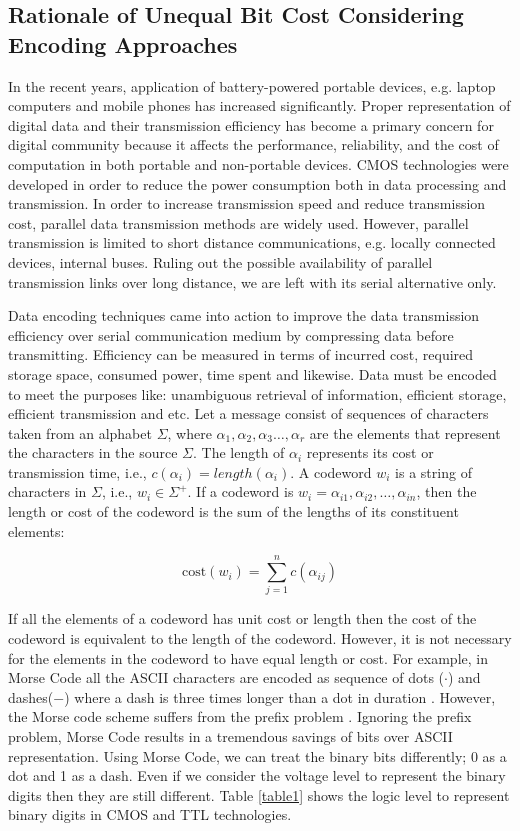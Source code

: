 \documentclass[preprint,12pt]{elsarticle}
\begin{document}
\subsection{Rationale of Unequal Bit Cost Considering Encoding Approaches}
In the recent years, application of battery-powered portable devices, e.g. laptop computers and mobile phones has increased significantly. Proper representation of digital data and their transmission efficiency has become a primary concern for digital community because it affects the performance, reliability, and the cost of computation in both portable and non-portable devices. CMOS technologies were developed in order to reduce the power consumption both in data processing and transmission. In order to increase transmission speed and reduce transmission cost, parallel data transmission methods are widely used. However, parallel transmission is limited to short distance communications, e.g. locally connected devices, internal buses. Ruling out the possible availability of parallel transmission
links over long distance, we are left with its serial alternative only. 

Data encoding techniques came into action to improve the data transmission efficiency over serial communication medium by compressing data before transmitting. Efficiency can be measured in terms of incurred cost, required storage space, consumed power, time spent and likewise. Data must be
encoded to meet the purposes like: unambiguous retrieval of information, efficient storage, efficient transmission and etc. Let a message consist of sequences of characters taken from an alphabet $\Sigma$, where  $\alpha_1,\alpha_2,\alpha_3\ldots,\alpha_r$ are the elements that represent the characters in the source $\Sigma$. The length of $\alpha_i$ represents its cost or transmission time, i.e., $c\left(\alpha_i\right)= length(\alpha_i)$. A codeword $w_i$ is a string of characters in $\Sigma$, i.e., $w_i\in\Sigma^{+}$. If a codeword is $w_i=\alpha_{i1},\alpha_{i2},\ldots,\alpha_{in}$, then the length or cost of the codeword is the sum of the lengths of its constituent elements:

\begin{equation}
\label{eqn1}
  \text{cost}\left(w_i\right)=\sum_{j=1}^{n}c\left(\alpha_{ij}\right)
\end{equation} 
  
If all the elements of a codeword has unit cost or length then the cost of the codeword is equivalent to the length of the codeword. However, it is not necessary for the elements in the codeword to have equal length or cost. For example, in Morse Code all the ASCII characters are encoded as sequence of dots ($\cdot$) and dashes($-$) where a dash is three times longer than a dot in duration \cite{Redmond09}. However, the Morse code scheme suffers from the prefix problem \cite{Gr03}. Ignoring the prefix problem, Morse Code results in a tremendous savings of bits over ASCII representation. Using Morse Code, we can treat the binary bits differently; 0 as a dot and 1 as a dash. Even if we consider the voltage level to represent the binary digits then they are still different. Table \ref{table1} shows the logic level to represent binary digits in CMOS and TTL technologies. 
\end{document}
